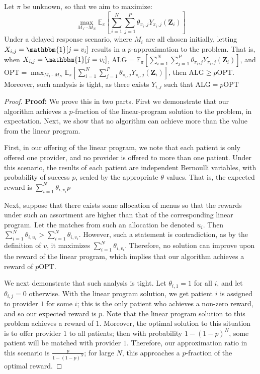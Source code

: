 \begin{theorem}
    Let $\pi$ be unknown, so that we aim to maximize: 
    \begin{equation}
        \max_{M_{1} \cdots M_{N}} \mathbb{E}_{\pi}[\sum_{i=1}^{N} \sum_{j=1}^{P} \theta_{\pi_{i},j} Y_{\pi_{i},j}(\mathbf{Z}_{i})]
    \end{equation}
    Under a delayed response scenario, where $M_{i}$ are all chosen initially, letting $X_{i,j} = \mathbbm{1}[j = v_{i}]$ results in a $p$-approximation to the problem. 
    That is, when $X_{i,j} = \mathbbm{1}[j = v_{i}]$, $\mathrm{ALG} = \mathbb{E}_{\pi}[\sum_{i=1}^{N} \sum_{j=1}^{P} \theta_{\pi_{i},j} Y_{\pi_{i},j}(\mathbf{Z}_{i})]$, and $\mathrm{OPT} = \max_{M_{1} \cdots M_{N}} \mathbb{E}_{\pi}[\sum_{i=1}^{N} \sum_{j=1}^{P} \theta_{\pi_{i},j} Y_{\pi_{i},j}(\mathbf{Z}_{i})]$, then $\mathrm{ALG} \geq p \mathrm{OPT}$. 
    Moreover, such analysis is tight, as there exists $Y_{i,j}$ such that $\mathrm{ALG} = p \mathrm{OPT}$
\end{theorem}
\begin{proof}
    \textbf{Proof:} We prove this in two parts. First we demonstrate that our algorithm achieves a $p$-fraction of the linear-program solution to the problem, in expectation. 
    Next, we show that no algorithm can achieve more than the value from the linear program. 

    First, in our offering of the linear program, we note that each patient is only offered one provider, and no provider is offered to more than one patient. 
    Under this scenario, the results of each patient are independent Bernoulli variables, with probability of success $p$, scaled by the appropriate $\theta$ values. 
    That is, the expected reward is $\sum_{i=1}^{N} \theta_{i,v_{i}} p$

    Next, suppose that there exists some allocation of menus so that the rewards under such an assortment are higher than that of the corresponding linear program. 
    Let the matches from such an allocation be denoted $u_{i}$. 
    Then $\sum_{i=1}^{N} \theta_{i,u_{i}} > \sum_{i=1}^{N} \theta_{i,v_{i}}$. 
    However, such a statement is contradiction, as by the definition of $v$, it maximizes $\sum_{i=1}^{N} \theta_{i,v_{i}}$. 
    Therefore, no solution can improve upon the reward of the linear program, which implies that our algorithm achieves a reward of $p \mathrm{OPT}$. 

    We next demonstrate that such analysis is tight. 
    Let $\theta_{i,1} = 1$ for all $i$, and let $\theta_{i,j} = 0$ otherwise. 
    With the linear program solution, we get patient $i$ is assigned to provider $1$ for some $i$; this is the only patient who achieves a non-zero reward, and so our expected reward is $p$. 
    Note that the linear program solution to this problem achieves a reward of $1$. 
    Moreover, the optimal solution to this situation is to offer provider $1$ to all patients; then with probability $1-(1-p)^{N}$, some patient will be matched with provider $1$. 
    Therefore, our approximation ratio in this scenario is $\frac{p}{1-(1-p)^{N}}$; for large $N$, this approaches a $p$-fraction of the optimal reward. 
\end{proof}

